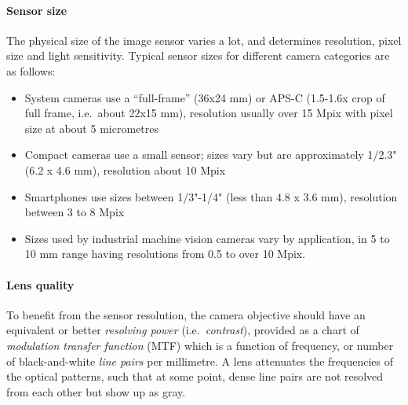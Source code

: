 
\paragraph{Sensor size}
The physical size of the image sensor varies a lot, and determines resolution, pixel size and light sensitivity.
Typical sensor sizes for different camera categories are as follows:

\begin{itemize}
	\item System cameras use a ``full-frame'' (36x24 mm) or APS-C (1.5-1.6x crop of full frame, i.e.~about 22x15 mm), resolution usually over 15 Mpix with pixel size at about 5 micrometres
	\item Compact cameras use a small sensor; sizes vary but are approximately 1/2.3" (6.2 x 4.6 mm), resolution about 10 Mpix
	\item Smartphones use sizes between 1/3"-1/4" (less than 4.8 x 3.6 mm), resolution between 3 to 8 Mpix
	\item Sizes used by industrial machine vision cameras vary by application, in 5 to 10 mm range having resolutions from 0.5 to over 10 Mpix.
\end{itemize}




\paragraph{Lens quality}
To benefit from the sensor resolution, the camera objective should have an equivalent or better \emph{resolving power} (i.e.\ \emph{contrast}), provided as a chart of \emph{modulation transfer function} (MTF) which is a function of frequency, or number of black-and-white \emph{line pairs} per millimetre.
A lens attenuates the frequencies of the optical patterns, such that at some point, dense line pairs are not resolved from each other but show up as gray.
\cite{nakamura2005image} \cite[p. 71]{kingslake1992optics}

